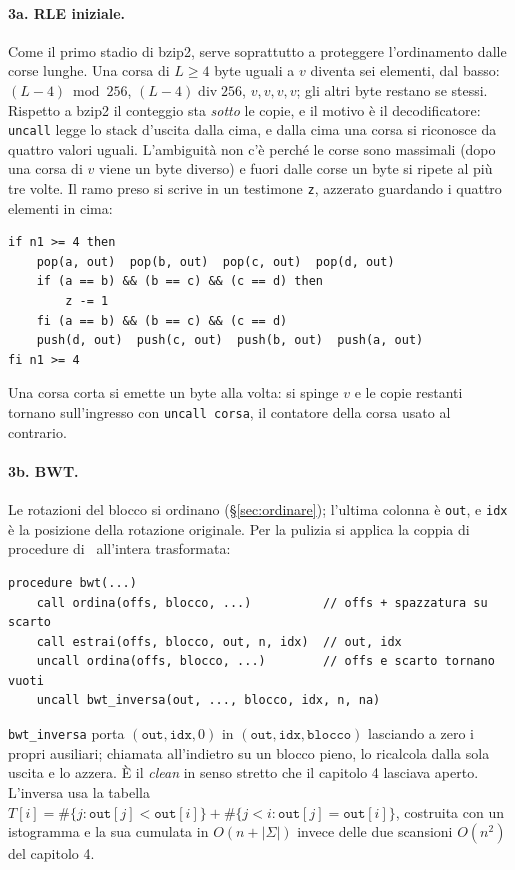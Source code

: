 \documentclass[11pt,a4paper]{article}
\newcommand{\kw}[1]{\texttt{#1}}
\begin{document}
\paragraph{3a. RLE iniziale.} Come il primo stadio di bzip2, serve soprattutto a proteggere l'ordinamento dalle corse lunghe. Una corsa di $L\ge4$ byte uguali a $v$ diventa sei elementi, dal basso: $(L-4)\bmod 256$, $(L-4)\operatorname{div}256$, $v,v,v,v$; gli altri byte restano se stessi. Rispetto a bzip2 il conteggio sta \emph{sotto} le copie, e il motivo è il decodificatore: \kw{uncall} legge lo stack d'uscita dalla cima, e dalla cima una corsa si riconosce da quattro valori uguali. L'ambiguità non c'è perché le corse sono massimali (dopo una corsa di $v$ viene un byte diverso) e fuori dalle corse un byte si ripete al più tre volte. Il ramo preso si scrive in un testimone \kw{z}, azzerato guardando i quattro elementi in cima:
\begin{lstlisting}
if n1 >= 4 then
    pop(a, out)  pop(b, out)  pop(c, out)  pop(d, out)
    if (a == b) && (b == c) && (c == d) then
        z -= 1
    fi (a == b) && (b == c) && (c == d)
    push(d, out)  push(c, out)  push(b, out)  push(a, out)
fi n1 >= 4
\end{lstlisting}
Una corsa corta si emette un byte alla volta: si spinge $v$ e le copie restanti tornano sull'ingresso con \kw{uncall corsa}, il contatore della corsa usato al contrario.

\paragraph{3b. BWT.} Le rotazioni del blocco si ordinano (§\ref{sec:ordinare}); l'ultima colonna è \kw{out}, e \kw{idx} è la posizione della rotazione originale. Per la pulizia si applica la coppia di procedure di~\cite{lyngby} all'intera trasformata:
\begin{lstlisting}
procedure bwt(...)
    call ordina(offs, blocco, ...)          // offs + spazzatura su scarto
    call estrai(offs, blocco, out, n, idx)  // out, idx
    uncall ordina(offs, blocco, ...)        // offs e scarto tornano vuoti
    uncall bwt_inversa(out, ..., blocco, idx, n, na)
\end{lstlisting}
\kw{bwt\_inversa} porta $(\kw{out}, \kw{idx}, 0)$ in $(\kw{out}, \kw{idx}, \kw{blocco})$ lasciando a zero i propri ausiliari; chiamata all'indietro su un blocco pieno, lo ricalcola dalla sola uscita e lo azzera. È il \emph{clean} in senso stretto che il capitolo 4 lasciava aperto. L'inversa usa la tabella $T[i] = \#\{j : \kw{out}[j] < \kw{out}[i]\} + \#\{j < i : \kw{out}[j] = \kw{out}[i]\}$, costruita con un istogramma e la sua cumulata in $O(n + |\Sigma|)$ invece delle due scansioni $O(n^2)$ del capitolo 4.
\end{document}
